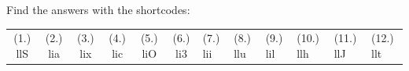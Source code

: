   \label{m37830**end}
\par {} Find the answers with the shortcodes:
 \par \begin{tabular}[h]{cccccc}
 (1.) llS  &  (2.) lia  &  (3.) lix  &  (4.) lic  &  (5.) liO  &  (6.) li3  &  (7.) lii  &  (8.) llu  &  (9.) lil  &  (10.) llh  &  (11.) llJ  &  (12.) llt  & \end{tabular}
